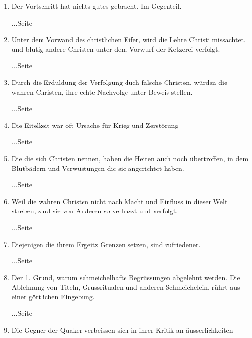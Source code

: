 \begin{enumerate}
 \item Der Vortschritt hat nichts gutes gebracht. Im Gegenteil.
 \begin{flushright}...Seite \pageref{ref:07_14_vortschritt}\end{flushright}
 \item Unter dem Vorwand des christlichen Eifer, wird die Lehre Christi
missachtet, und blutig andere Christen unter dem Vorwurf der Ketzerei verfolgt.
 \begin{flushright}...Seite \pageref{ref:07_14_ketzer}\end{flushright}
 \item Durch die Erduldung der Verfolgung duch falsche Christen, würden die
wahren Christen, ihre echte Nachvolge unter Beweis stellen.
 \begin{flushright}...Seite \pageref{ref:07_16_vervolgung}\end{flushright}
 \item Die Eitelkeit war oft Ursache für Krieg und Zerstörung
 \begin{flushright}...Seite \pageref{ref:08_01_stolz}\end{flushright}
 \item Die die sich Christen nennen, haben die Heiten auch noch übertroffen, in
dem Blutbädern und Verwüstungen die sie angerichtet haben.
 \begin{flushright}...Seite \pageref{ref:08_06_heiden}\end{flushright}
 \item Weil die wahren Christen nicht nach Macht und Einfluss in dieser Welt
streben, sind sie von Anderen so verhasst und verfolgt.
 \begin{flushright}...Seite \pageref{ref:08_08_reich_gottes}\end{flushright}
 \item Diejenigen die ihrem Ergeitz Grenzen setzen, sind zufriedener.
 \begin{flushright}...Seite \pageref{ref:08_09_friedem}\end{flushright}
 \item Der 1. Grund, warum schmeichelhafte Begrüssungen abgelehnt werden. Die
Ablehnung von Titeln, Grussritualen und anderen Schmeichelein, rührt aus einer
göttlichen Eingebung.
 \begin{flushright}...Seite \pageref{ref:09_05_offenbarung}\end{flushright}
 \item Die Gegner der Quaker verbeissen sich in ihrer Kritik an äusserlichkeiten

\end{enumerate}
